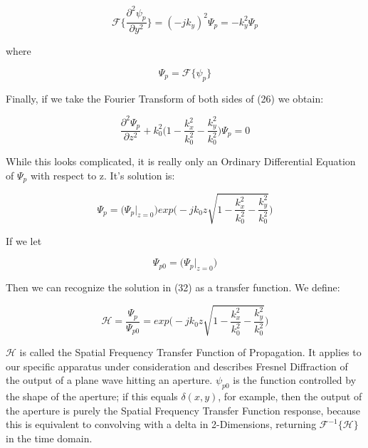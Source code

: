 \documentclass[12pt]{article}
\begin{document}
\begin{equation}
	\mathscr{F} \Big\{ \frac{\partial^2 \psi_{p}}{\partial y^2} \Big\} = (-jk_{y})^2\Psi_{p} = -k_{y}^2\Psi_{p}
\end{equation}

where

\begin{equation}
	\Psi_{p} = \mathscr{F} \{\psi_{p}\}
\end{equation}

Finally, if we take the Fourier Transform of both sides of (26) we obtain:

\begin{equation}
	\frac{\partial^2\Psi_{p}}{\partial z^2} + k_{0}^{2} \bigg ( 1 - \frac{k_{x}^2}{k_{0}^2} - \frac{k_{y}^2}{k_{0}^2} \bigg ) \Psi_{p} = 0
\end{equation}

While this looks complicated, it is really only an Ordinary Differential Equation of \(\Psi_{p}\) with respect to z. It's solution is:

\begin{equation}
	\Psi_{p} = \big(\Psi_{p}\vert_{z = 0}\big) exp\Bigg(-jk_{0}z\sqrt{1 - \frac{k_{x}^2}{k_{0}^2} - \frac{k_{y}^2}{k_{0}^2}}\Bigg)
\end{equation}

If we let

\begin{equation}
	\Psi_{p0} = \big(\Psi_{p}\vert_{z = 0}\big)
\end{equation}

Then we can recognize the solution in (32) as a transfer function. We define:

\begin{equation}
	\mathscr{H} = \frac{\Psi_{p}}{\Psi_{p0}} = exp\Bigg(-jk_{0}z\sqrt{1 - \frac{k_{x}^2}{k_{0}^2} - \frac{k_{y}^2}{k_{0}^2}}\Bigg)
\end{equation}

\(\mathscr{H}\) is called the Spatial Frequency Transfer Function of Propagation. It applies to our specific apparatus under consideration and describes Fresnel Diffraction of the output of a plane wave hitting an aperture. \(\psi_{p0}\) is the function controlled by the shape of the aperture; if this equals \(\delta(x,y)\), for example, then the output of the aperture is purely the Spatial Frequency Transfer Function response, because this is equivalent to convolving with a delta in 2-Dimensions, returning \(\mathscr{F}^{-1} \{\mathscr{H}\} \) in the time domain.
\end{document}
